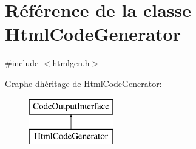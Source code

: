 \hypertarget{class_html_code_generator}{}\section{Référence de la classe Html\+Code\+Generator}
\label{class_html_code_generator}


{\ttfamily \#include $<$htmlgen.\+h$>$}

Graphe d\textquotesingle{}héritage de Html\+Code\+Generator\+:\begin{figure}[H]
\begin{center}
\leavevmode
\includegraphics[height=2.000000cm]{class_html_code_generator}
\end{center}
\end{figure}

